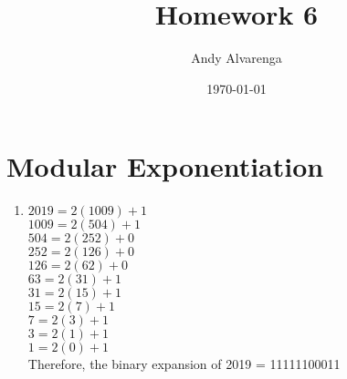 \documentclass[11pt]{article}
\begin{document}
\title{Homework 6}
\author{Andy Alvarenga}
\date{\today}
\maketitle

\section{Modular Exponentiation}

\begin{enumerate}

\item
$ 2019 = 2(1009) + 1 $\\
$ 1009 = 2(504) + 1 $\\
$ 504 = 2(252) + 0 $\\
$ 252 = 2(126) + 0 $\\
$ 126 = 2(62) + 0 $\\
$ 63 = 2(31) + 1 $\\
$ 31 = 2(15) + 1 $\\
$ 15 = 2(7) + 1 $\\
$ 7 = 2(3) + 1 $\\
$ 3 = 2(1) + 1 $\\
$ 1 = 2(0) + 1 $\\
Therefore, the binary expansion of 2019 = 11111100011\\


\end{enumerate}
\end{document}
